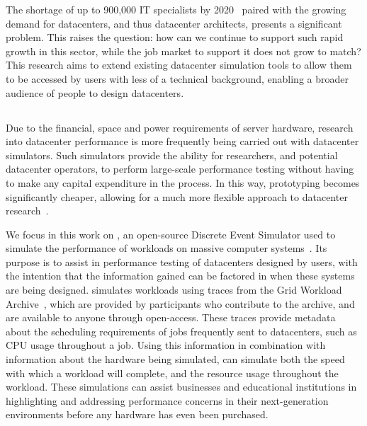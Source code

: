 \documentclass[11pt]{article}
\begin{document}
	The shortage of up to 900,000 IT specialists by 2020~\cite{Gareis2014} paired with the growing demand for datacenters, and thus datacenter architects, presents a significant problem.
	This raises the question: how can we continue to support such rapid growth in this sector, while the job market to support it does not grow to match?
	This research aims to extend existing datacenter simulation tools to allow them to be accessed by users with less of a technical background, enabling a broader audience of people to design datacenters.

	\subsection{\opendc{}}
		Due to the financial, space and power requirements of server hardware, research into datacenter performance is more frequently being carried out with datacenter simulators.
		Such simulators provide the ability for researchers, and potential datacenter operators, to perform large-scale performance testing without having to make any capital expenditure in the process.
		In this way, prototyping becomes significantly cheaper, allowing for a much more flexible approach to datacenter research~\cite{Iosup2017}.

		We focus in this work on \opendc{}, an open-source Discrete Event Simulator used to simulate the performance of workloads on massive computer systems~\cite{Iosup2017}. 
		Its purpose is to assist in performance testing of datacenters designed by users, with the intention that the information gained can be factored in when these systems are being designed. 
		\opendc{} simulates workloads using traces from the Grid Workload Archive~\cite{Iosup2008}, which are provided by participants who contribute to the archive, and are available to anyone through open-access. 
		These traces provide metadata about the scheduling requirements of jobs frequently sent to datacenters, such as CPU usage throughout a job. 
		Using this information in combination with information about the hardware being simulated, \opendc{} can simulate both the speed with which a workload will complete, and the resource usage throughout the workload. 
		These simulations can assist businesses and educational institutions in highlighting and addressing performance concerns in their next-generation environments before any hardware has even been purchased.
\end{document}
